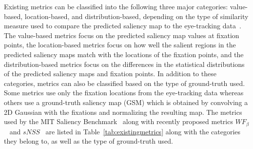 \documentclass[12pt,onecolumn,journal,	draftclsnofoot]{IEEEtran}
\begin{document}
Existing metrics can be classified into the following three major categories: value-based, location-based, and distribution-based, depending on the type of similarity measure used to compare the predicted saliency map to the eye-tracking data~\cite{riche2013saliency}. The value-based metrics focus on the predicted saliency map values at fixation points, the location-based metrics focus on how well the salient regions in the predicted saliency maps match with the locations of the fixation points, and the distribution-based metrics focus on the differences in the statistical distributions of the predicted saliency maps and fixation points. In addition to these categories, metrics can also be  classified based on the type  of ground-truth used. Some metrics use only the fixation locations from the eye-tracking data whereas others use a ground-truth saliency map (GSM) which is obtained by convolving a 2D Gaussian with the fixations and normalizing the resulting map.  The metrics used by the MIT Saliency Benchmark~\cite{mit-saliency-benchmark} along with recently proposed metrics  $WF_{\beta}$~\cite{margolin2014evaluate} and $sNSS$~\cite{MilindSamTPAMI}   are listed in Table~\ref{tab:existingmetrics} along with  the categories they belong to, as well as the type of ground-truth used.  
\end{document}
